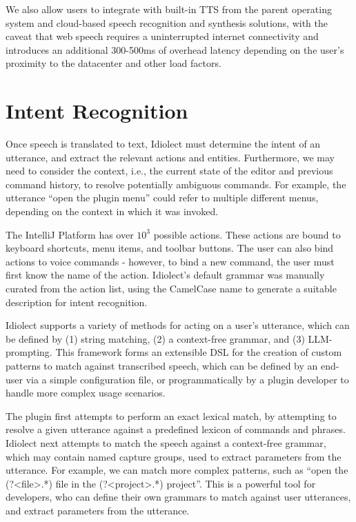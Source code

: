 \documentclass[conference]{IEEEtran}
\begin{document}

We also allow users to integrate with built-in TTS from the parent operating system and cloud-based speech recognition and synthesis solutions, with the caveat that web speech requires a uninterrupted internet connectivity and introduces an additional 300-500ms of overhead latency depending on the user's proximity to the datacenter and other load factors.

\section{Intent Recognition}

Once speech is translated to text, Idiolect must determine the intent of an utterance, and extract the relevant actions and entities. Furthermore, we may need to consider the context, i.e., the current state of the editor and previous command history, to resolve potentially ambiguous commands. For example, the utterance ``open the plugin menu'' could refer to multiple different menus, depending on the context in which it was invoked.

The IntelliJ Platform has over $10^3$ possible actions. These actions are bound to keyboard shortcuts, menu items, and toolbar buttons. The user can also bind actions to voice commands - however, to bind a new command, the user must first know the name of the action. Idiolect's default grammar was manually curated from the action list, using the CamelCase name to generate a suitable description for intent recognition.

Idiolect supports a variety of methods for acting on a user's utterance, which can be defined by (1) string matching, (2) a context-free grammar, and (3) LLM-prompting. This framework forms an extensible DSL for the creation of custom patterns to match against transcribed speech, which can be defined by an end-user via a simple configuration file, or programmatically by a plugin developer to handle more complex usage scenarios.

The plugin first attempts to perform an exact lexical match, by attempting to resolve a given utterance against a predefined lexicon of commands and phrases. Idiolect next attempts to match the speech against a context-free grammar, which may contain named capture groups, used to extract parameters from the utterance. For example, we can match more complex patterns, such as ``open the (?<file>.*) file in the (?<project>.*) project''. This is a powerful tool for developers, who can define their own grammars to match against user utterances, and extract parameters from the utterance.
\end{document}
